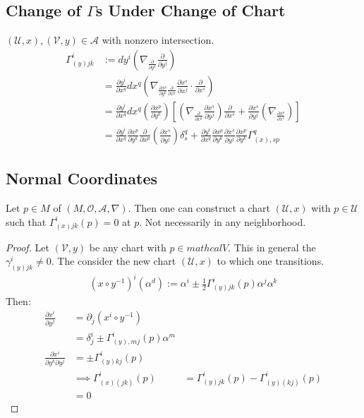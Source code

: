 \documentclass[10pt, oneside]{article}
\begin{document}
   \subsection{Change of $\Gamma$s Under Change of Chart}
      $(\mathcal{U},x),(\mathcal{V},y) \in \mathcal{A}$ with nonzero intersection. 
      \begin{align*}
         \Gamma_{(y)jk}^i &:= dy^i (\nabla_{\frac{\partial}{\partial y^k}} \frac{\partial}{\partial y^j}) \\
         &= \frac{\partial y^i}{\partial x^q} dx^q (\nabla_{\frac{\partial x^p}{\partial y^k} \frac{\partial}{\partial x^p}} \frac{\partial x^s}{\partial x^j} \cdot \frac{\partial}{\partial x^s}) \\
          &= \frac{\partial y^i}{\partial x^q} dx^q (\frac{\partial x^p}{\partial y^k})[(\nabla_{\frac{\partial}{\partial x^p}} \frac{\partial x^s}{\partial y^j}) \frac{\partial}{\partial x^s} + \frac{\partial x^s}{\partial y^j} (\nabla_{\frac{\partial x^p}{\partial x^s}})] \\
         &= \frac{\partial y^i}{\partial x^q} \frac{\partial x^p}{\partial y^k}\frac{\partial}{\partial x^p} (\frac{\partial x^s}{\partial y^j}) \delta^q_s + \frac{\partial y^i}{\partial x^q} \frac{\partial x^p}{\partial y^k} \frac{\partial x^s}{\partial y^j} \frac{\partial x^p}{\partial y^k} \Gamma_{(x),sp}^q 
         \end{align*}
   \subsection{Normal Coordinates}
   Let $p \in M$ of $(M, \mathcal{O},\mathcal{A},\nabla)$. Then one can construct a chart $(\mathcal{U},x)$ with $p \in \mathcal{U}$ such that $\Gamma_{(x) jk}^i (p)=0$ at $p$. Not necessarily in any neighborhood.
   \begin{proof}
   Let $(\mathcal{V},y)$ be any chart with $p \in mathcal{V}$. This in general the $\gamma_{(y)jk}^i \neq 0$. The consider the new chart $(\mathcal{U},x)$ to which one transitions.
   \begin{align*}
      (x \circ y^{-1})^i (\alpha^d) := \alpha^i \pm \frac{1}{2} \Gamma^i_{(y)jk} (p) \alpha^j \alpha^k 
   \end{align*} 
   Then: 
   \begin{align*}
      \frac{\partial x^i}{\partial y^j} &= \partial_j (x^i \circ y^{-1} ) \\
      & = \delta^i_j \pm \Gamma^i_{(y), mj}(p) \alpha^m \\
      \frac{\partial x^i}{\partial y^k \partial y^j} &= \pm \Gamma^i_{(y) kj} (p) \\
      & \implies
      \Gamma^i_{(x)(jk)} (p) &= \Gamma_{(y) jk}^i (p) - \Gamma^i_{(y)(kj)}(p) \\
      &= 0
   \end{align*}
   \end{proof}
\end{document}
